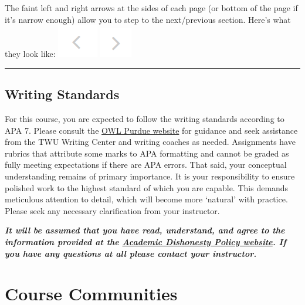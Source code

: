 \documentclass[
]{book}
\begin{document}
The faint left and right arrows at the sides of each page (or bottom of the page if it's narrow enough) allow you to step to the next/previous section. Here's what they look like:
\includegraphics{assets/course-intro/left_arrow.png} \includegraphics{assets/course-intro/right_arrow.png}

\begin{center}\rule{0.5\linewidth}{0.5pt}\end{center}

\hypertarget{writing-standards}{%
\section*{Writing Standards}\label{writing-standards}}

For this course, you are expected to follow the writing standards according to APA 7. Please consult the \href{https://owl.purdue.edu/owl/research_and_citation/apa_style/apa_style_introduction.html}{OWL Purdue website} for guidance and seek assistance from the TWU Writing Center and writing coaches as needed. Assignments have rubrics that attribute some marks to APA formatting and cannot be graded as fully meeting expectations if there are APA errors. That said, your conceptual understanding remains of primary importance. It is your responsibility to ensure polished work to the highest standard of which you are capable. This demands meticulous attention to detail, which will become more `natural' with practice. Please seek any necessary clarification from your instructor.

\begin{caution}
\textbf{\emph{It will be assumed that you have read, understand, and
agree to the information provided at the
\href{https://www.twu.ca/student-policies/university-policies/academic-misconduct}{Academic
Dishonesty Policy website}. If you have any questions at all please
contact your instructor.}}
\end{caution}

\hypertarget{course-communities}{%
\chapter*{Course Communities}\label{course-communities}}
\end{document}
